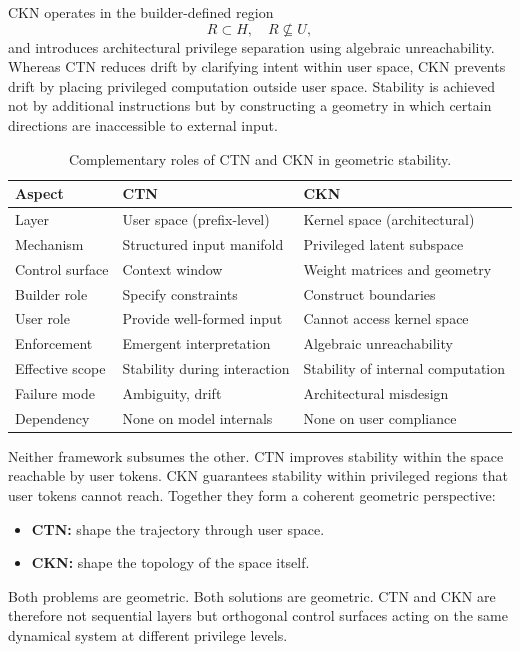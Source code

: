 \documentclass[11pt,a4paper]{article}
\begin{document}
CKN operates in the builder-defined region
\[
R \subset H, \quad R \not\subseteq U,
\]
and introduces architectural privilege separation using algebraic unreachability. Whereas CTN reduces drift by clarifying intent within user space, CKN prevents drift by placing privileged computation outside user space. Stability is achieved not by additional instructions but by constructing a geometry in which certain directions are inaccessible to external input.

\begin{table}[h]
\centering
\begin{tabular}{lll}
\toprule
\textbf{Aspect} & \textbf{CTN} & \textbf{CKN} \\
\midrule
Layer & User space (prefix-level) & Kernel space (architectural) \\
Mechanism & Structured input manifold & Privileged latent subspace \\
Control surface & Context window & Weight matrices and geometry \\
Builder role & Specify constraints & Construct boundaries \\
User role & Provide well-formed input & Cannot access kernel space \\
Enforcement & Emergent interpretation & Algebraic unreachability \\
Effective scope & Stability during interaction & Stability of internal computation \\
Failure mode & Ambiguity, drift & Architectural misdesign \\
Dependency & None on model internals & None on user compliance \\
\bottomrule
\end{tabular}
\caption{Complementary roles of CTN and CKN in geometric stability.}
\end{table}

Neither framework subsumes the other. CTN improves stability within the space reachable by user tokens. CKN guarantees stability within privileged regions that user tokens cannot reach. Together they form a coherent geometric perspective:
\begin{itemize}
    \item \textbf{CTN:} shape the trajectory through user space.
    \item \textbf{CKN:} shape the topology of the space itself.
\end{itemize}

Both problems are geometric. Both solutions are geometric. CTN and CKN are therefore not sequential layers but orthogonal control surfaces acting on the same dynamical system at different privilege levels.
\end{document}
